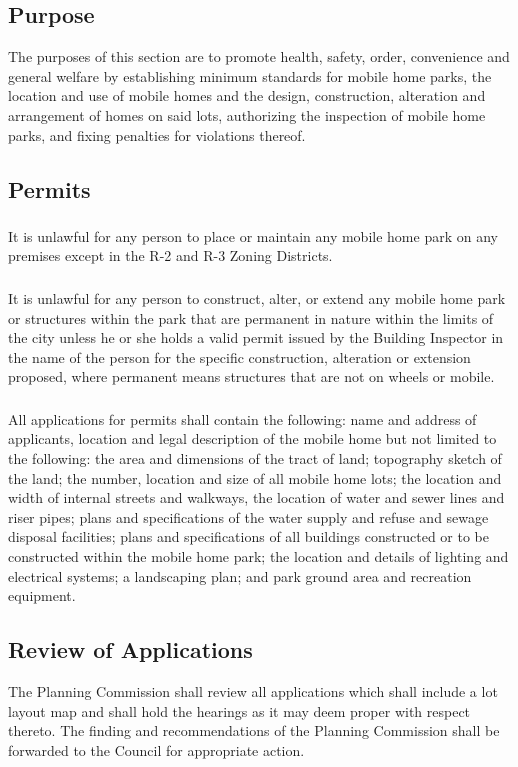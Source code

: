 \subsection{Purpose}
The purposes of this section are to promote health, safety, order, convenience and general welfare by establishing minimum standards for mobile home parks, the location and use of mobile homes and the design, construction, alteration and arrangement of homes on said lots, authorizing the inspection of mobile home parks, and fixing penalties for violations thereof.
\subsection{Permits}
\subsubsection{}
It is unlawful for any person to place or maintain any mobile home park on any premises except in the R-2 and R-3 Zoning Districts.
\subsubsection{}
It is unlawful for any person to construct, alter, or extend any mobile home park or structures within the park that are permanent in nature within the limits of the city unless he or she holds a valid permit issued by the Building Inspector in the name of the person for the specific construction, alteration or extension proposed, where permanent means structures that are not on wheels or mobile.
\subsubsection{}
All applications for permits shall contain the following: name and address of applicants, location and legal description of the mobile home but not limited to the following: the area and dimensions of the tract of land; topography sketch of the land; the number, location and size of all mobile home lots; the location and width of internal streets and walkways, the location of water and sewer lines and riser pipes; plans and specifications of the water supply and refuse and sewage disposal facilities; plans and specifications of all buildings constructed or to be constructed within the mobile home park; the location and details of lighting and electrical systems; a landscaping plan; and park ground area and recreation equipment.
\subsection{Review of Applications}
The Planning Commission shall review all applications which shall include a lot layout map and shall hold the hearings as it may deem proper with respect thereto. The finding and recommendations of the Planning Commission shall be forwarded to the Council for appropriate action.
